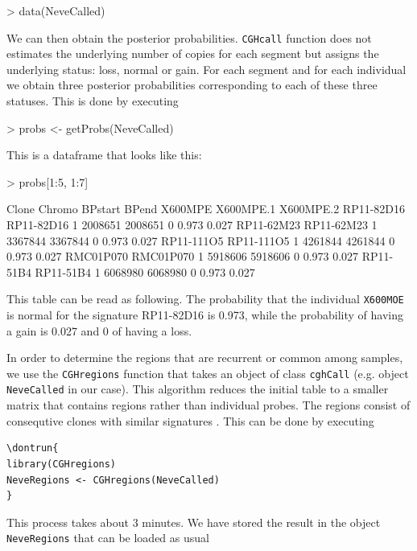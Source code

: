 \documentclass[11pt]{article}
\begin{document}
\begin{Schunk}
\begin{Sinput}
> data(NeveCalled)
\end{Sinput}
\end{Schunk}

%
We can then obtain the posterior probabilities. {\tt CGHcall} function does not estimates the underlying number of copies for each 
segment but assigns the underlying status: loss, normal or gain. For each segment and for each individual we obtain three posterior 
probabilities corresponding to each of these three statuses. This is done by executing
%

\begin{Schunk}
\begin{Sinput}
> probs <- getProbs(NeveCalled)
\end{Sinput}
\end{Schunk}

%
This is a dataframe that looks like this:
%

\begin{Schunk}
\begin{Sinput}
> probs[1:5, 1:7]
\end{Sinput}
\begin{Soutput}
                Clone Chromo BPstart   BPend X600MPE X600MPE.1 X600MPE.2
RP11-82D16 RP11-82D16      1 2008651 2008651       0     0.973     0.027
RP11-62M23 RP11-62M23      1 3367844 3367844       0     0.973     0.027
RP11-111O5 RP11-111O5      1 4261844 4261844       0     0.973     0.027
RMC01P070   RMC01P070      1 5918606 5918606       0     0.973     0.027
RP11-51B4   RP11-51B4      1 6068980 6068980       0     0.973     0.027
\end{Soutput}
\end{Schunk}

%
This table can be read as following. The probability that the  individual {\tt X600MOE} is normal for the signature RP11-82D16 is 0.973, while the probability of having a gain is 0.027 and 0 of having a loss.

In order to determine the regions that are recurrent or common among samples, we use the {\tt CGHregions} function that takes an object 
of class {\tt cghCall} (e.g. object {\tt NeveCalled} in our case). This algorithm reduces the initial table to a smaller matrix that 
contains regions rather than individual probes. The regions consist of consequtive clones with similar signatures \cite{WieWie07}. 
This can be done by executing
%
\begin{verbatim}
\dontrun{
library(CGHregions)
NeveRegions <- CGHregions(NeveCalled)
}
\end{verbatim}
%
This process takes about 3 minutes. We have stored the result in the object {\tt NeveRegions} that can be loaded as usual
%
\end{document}
